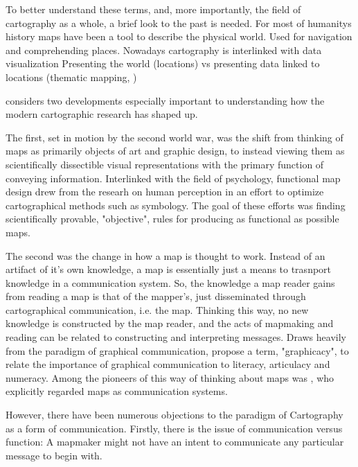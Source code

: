\documentclass[12pt]{article}
\begin{document}
To better understand these terms,
and, more importantly, the field of cartography as a whole,
a brief look to the past is needed.
For most of humanitys history maps have been a tool to describe the physical world.
Used for navigation and comprehending places.
Nowadays cartography is interlinked with data visualization
Presenting the world (locations) vs presenting data linked to locations (thematic mapping, \parencite{tyn1992})

\textcite{mac2004} considers two developments especially important
to understanding how the modern cartographic research has shaped up.

The first, set in motion by the second world war, was
the shift from thinking of maps as primarily objects of art and graphic design,
to instead viewing them as scientifically dissectible visual representations
with the primary function of conveying information.
Interlinked with the field of psychology,
functional map design drew from the researh on human perception
in an effort to optimize cartographical methods such as symbology.
The goal of these efforts was finding scientifically provable, "objective", rules
for producing as functional as possible maps.

The second was the change in how a map is thought to work.
Instead of an artifact of it's own knowledge,
a map is essentially just a means to trasnport knowledge in a communication system.
So, the knowledge a map reader gains from reading a map is that of the mapper's,
just disseminated through cartographical communication, i.e. the map.
Thinking this way, no new knowledge is constructed by the map reader,  %
and the acts of mapmaking and reading can be related to constructing and interpreting messages.
Draws heavily from the paradigm of graphical communication,  %
\textcite{bal1966} propose a term, "graphicacy",
to relate the importance of graphical communication to literacy, articulacy and numeracy.
Among the pioneers of this way of thinking about maps was \textcite{kol1969},
who explicitly regarded maps as communication systems.

However, there have been numerous objections to the paradigm of Cartography as a form of communication.
Firstly, there is the issue of communication versus function:
A mapmaker might not have an intent to communicate any particular message to begin with.
\end{document}
